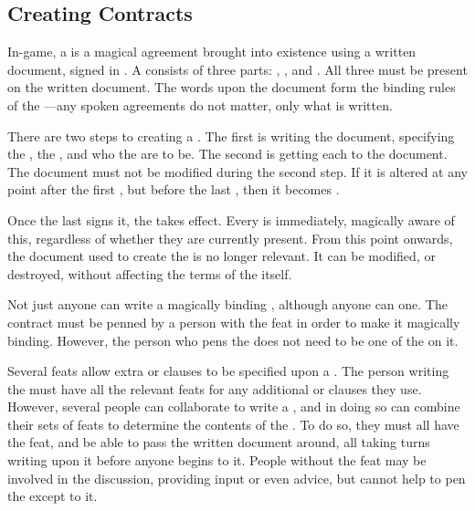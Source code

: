 \subsection{Creating Contracts}

In-game, a {\contract} is a magical agreement brought into existence using a written document, signed in .
A {\contract} consists of three parts: {\stipulations}, {\penalties}, and {\signatories}.
All three must be present on the written document.
The words upon the document form the binding rules of the {\contract}---any spoken agreements do not matter, only what is written.

There are two steps to creating a {\contract}.
The first is writing the document, specifying the {\stipulations}, the {\penalties}, and who the {\signatories} are to be.
The second is getting each {\signatory} to {\sign} the document.
The document must not be modified during the second step.
If it is altered at any point after the first {\signatory} {\signs}, but before the last {\signatory} {\signs}, then it becomes {\void}.

Once the last {\signatory} signs it, the {\contract} takes effect.
Every {\signatory} is immediately, magically aware of this, regardless of whether they are currently present.
From this point onwards, the document used to create the {\contract} is no longer relevant.
It can be modified, or destroyed, without affecting the terms of the {\contract} itself.

Not just anyone can write a magically binding {\contract}, although anyone can {\sign} one.
The contract must be penned by a person with the  feat in order to make it magically binding.
However, the person who pens the {\contract} does not need to be one of the {\signatories} on it.

Several feats allow extra {\penalties} or clauses to be specified upon a {\contract}.
The person writing the {\contract} must have all the relevant feats for any additional {\penalties} or clauses they use.
However, several people can collaborate to write a {\contract}, and in doing so can combine their sets of feats to determine the contents of the {\contract}.
To do so, they must all have the  feat, and be able to pass the written document around, all taking turns writing upon it before anyone begins to {\sign} it.
People without the  feat may be involved in the discussion, providing input or even advice, but cannot help to pen the {\contract} except to {\sign} it.

